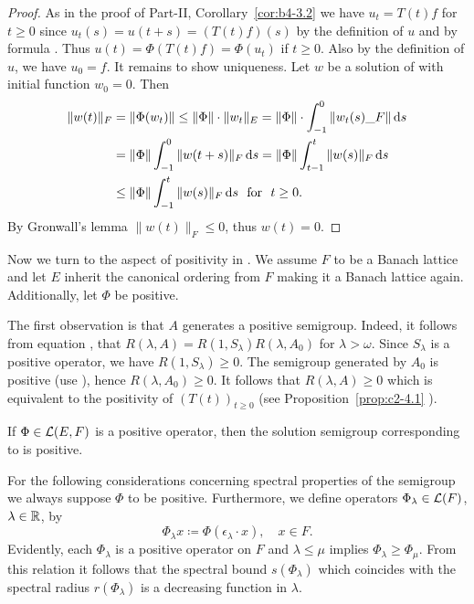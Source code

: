 \begin{proof}
As in the proof of Part-II, Corollary~\ref{cor:b4-3.2} we have $u_t = T(t)f$ for $t \geq 0$ since $u_t(s) = u(t+s) = (T(t)f)(s)$ by the definition of\/ $u$ and by formula .
Thus $u(t) = \Phi(T(t)f) = \Phi(u_t)$ if\/ $t \geq 0$.
Also by the definition of\/ $u$, we have $u_{0} = f$.
It remains to show uniqueness.
Let $w$ be a solution of  with initial function $w_{0} = 0$.
Then
\begin{align*}
\|w(t)\|_F & = \|\Phi(w_{t})\| \leq \|\Phi\| \cdot  \|w_{t}\|_{E} =  \|\Phi\| \cdot \int_{-1}^{0} \|w_{t}(s)\_{F}\| \ds \\
&=  \|\Phi\| \int_{-1}^0 \|w(t+s)\|_{F} \ds = \|\Phi\| \int_{t-1}^{t} \|w(s)\|_{F} \ds \\
&\leq \|\Phi\| \int_{-1}^{t} \|w(s)\|_{F} \ds \ \text{ for } \ t \geq 0 .
\end{align*}
By Gronwall's lemma $\|w(t)\|_F \leq 0$, thus $w(t) = 0$.
\end{proof}
Now we turn to the aspect of positivity in . We assume $F$ to be a Banach lattice and let $E$ inherit the canonical ordering from $F$ making it a Banach lattice again. Additionally, let $\Phi$ be positive.

The first observation is that $A$ generates a positive semigroup.
Indeed, it follows from equation , that $R(\lambda,A) = R(1,S_\lambda)R(\lambda,A_{0})$ for $\lambda > \omega$. Since $S_\lambda$ is a positive operator, we have $R(1,S_\lambda) \geq 0$.
The semigroup generated by $A_{0}$ is positive (use ), hence $R(\lambda,A_{0}) \geq 0$.
It follows that $R(\lambda,A) \geq 0$ which is equivalent to the positivity of\/ $(T(t))_{t \geq 0}$ (see Proposition~\ref{prop:c2-4.1} ).
\begin{proposition}\label{prop:c4-3.3}
If\/ $\Phi \in \mathcal{L}(E,F)$ is a positive operator, then the solution semigroup corresponding to  is positive.
\end{proposition}
For the following considerations concerning spectral properties of the semigroup we always suppose $\Phi$ to be positive. Furthermore, we define operators $\Phi_{\lambda} \in \mathcal{L}(F)$, $\lambda \in \mathbb{R}$, by
\begin{equation}\label{eq:c4-3.6}
\Phi_\lambda x \coloneq \Phi(\epsilon_{\lambda} \cdot x), \quad x \in F .
\end{equation}
Evidently, each $\Phi_\lambda$ is a positive operator on $F$ and $\lambda \leq \mu$ implies $\Phi_{\lambda} \geq \Phi_{\mu}$.
From this relation it follows that the spectral bound $s(\Phi_{\lambda})$ which coincides with the spectral radius $r(\Phi_{\lambda})$ is a decreasing function in $\lambda$.

